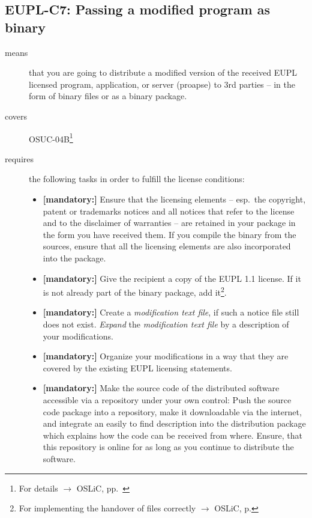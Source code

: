\subsection{EUPL-C7: Passing a modified program as binary}
\label{OSUC-04B-EUPL}

\begin{description}
\item[means] that you are going to distribute a modified version of the received
EUPL licensed pro\-gram, application, or server (proapse) to 3rd parties -- in
the form of binary files or as a binary package.
\item[covers] OSUC-04B\footnote{For details $\rightarrow$ OSLiC, pp.\
\pageref{OSUC-04B-DEF}}
\item[requires] the following tasks in order to fulfill the license conditions:
\begin{itemize}

  \item \textbf{[mandatory:]} Ensure that the licensing elements -- esp.\ the
  copyright, patent or trademarks notices and all notices that refer to the
  license and to the disclaimer of warranties -- are retained in your package in
  the form you have received them. If you compile the binary from the sources,
  ensure that all the licensing elements are also incorporated into the package.

 \item \textbf{[mandatory:]} Give the recipient a copy of the EUPL 1.1
  license. If it is not already part of the binary package, add
  it\footnote{For implementing the handover of files correctly $\rightarrow$
  OSLiC, p. \pageref{DistributingFilesHint}}.
  
  \item \textbf{[mandatory:]} Create a \emph{modification text file}, if such a
  notice file still does not exist. \emph{Expand} the \emph{modification text
  file} by a description of your modifications.

  \item \textbf{[mandatory:]} Organize your modifications in a way that they are
  covered by the existing EUPL licensing statements.
  
  \item \textbf{[mandatory:]} Make the source code of the distributed software
  accessible via a repository under your own control: Push the source code
  package into a repository, make it downloadable via the internet, and
  integrate an easily to find description into the distribution package which
  explains how the code can be received from where. Ensure, that this repository
  is online for as long as you continue to distribute the software.
  

\end{itemize}
\end{description}
